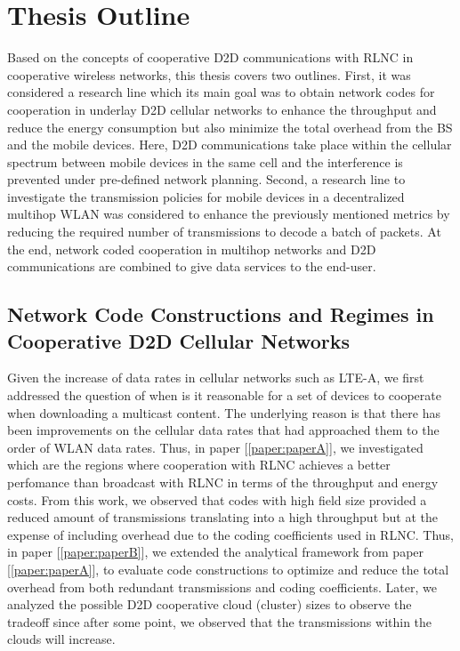 \section{Thesis Outline}\label{sec:intro_thesis_outline}

Based on the concepts of cooperative \ac{D2D} communications with \ac{RLNC} in cooperative wireless networks, this thesis covers two outlines. First, it was considered a research line which its main goal was to obtain network codes for cooperation in underlay \ac{D2D} cellular networks to enhance the throughput and reduce the energy consumption but also minimize the total overhead from the \ac{BS} and the mobile devices. Here, \ac{D2D} communications take place within the cellular spectrum between mobile devices in the same cell and the interference is prevented under pre-defined network planning. Second, a research line to investigate the transmission policies for mobile devices in a decentralized multihop \ac{WLAN} was considered to enhance the previously mentioned metrics by reducing the required number of transmissions to decode a batch of packets. At the end, network coded cooperation in multihop networks and \ac{D2D} communications are combined to give data services to the end-user.

\subsection{Network Code Constructions and Regimes in Cooperative D2D Cellular Networks}

Given the increase of data rates in cellular networks such as \ac{LTE-A}, we first addressed the question of when is it reasonable for a set of devices to cooperate when downloading a multicast content. The underlying reason is that there has been improvements on the cellular data rates that had approached them to the order of \ac{WLAN} data rates. Thus, in paper {[\ref{paper:paperA}]}, we investigated which are the regions where cooperation with \ac{RLNC} achieves a better perfomance than broadcast with \ac{RLNC} in terms of the throughput and energy costs. From this work, we observed that codes with high field size provided a reduced amount of transmissions translating into a high throughput but at the expense of including overhead due to the coding coefficients used in \ac{RLNC}. Thus, in paper {[\ref{paper:paperB}]}, we extended the analytical framework from paper {[\ref{paper:paperA}]}, to evaluate code constructions to optimize and reduce the total overhead from both redundant transmissions and coding coefficients. Later, we analyzed the possible \ac{D2D} cooperative cloud (cluster) sizes to observe the tradeoff since after some point, we observed that the transmissions within the clouds will increase.


